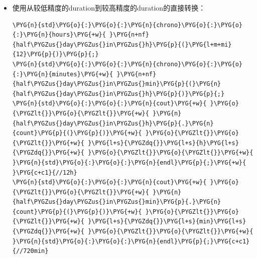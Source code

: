\begin{itemize}
\begin{codeblockbg}
\begin{Verbatim}[commandchars=\\\{\},breaklines=true,breakanywhere=true,fontsize=\codefont,xleftmargin=17bp]
\PYG{k}{using}\PYG{+w}{ }\PYG{k}{namespace}\PYG{+w}{ }\PYG{n+nn}{std}\PYG{o}{:}\PYG{o}{:}\PYG{n+nn}{chrono\PYGZus{}literals}\PYG{p}{;}
\PYG{k}{auto}\PYG{+w}{ }\PYG{n}{half\PYGZus{}day}\PYG{+w}{         }\PYG{o}{=}\PYG{+w}{ }\PYG{l+m+mi}{12}\PYG{n}{h}\PYG{p}{;}
\PYG{k}{auto}\PYG{+w}{ }\PYG{n}{half\PYGZus{}hour}\PYG{+w}{        }\PYG{o}{=}\PYG{+w}{ }\PYG{l+m+mi}{30}\PYG{n}{min}\PYG{p}{;}
\PYG{k}{auto}\PYG{+w}{ }\PYG{n}{half\PYGZus{}minute}\PYG{+w}{      }\PYG{o}{=}\PYG{+w}{ }\PYG{l+m+mi}{30}\PYG{n}{s}\PYG{p}{;}
\PYG{k}{auto}\PYG{+w}{ }\PYG{n}{half\PYGZus{}second}\PYG{+w}{      }\PYG{o}{=}\PYG{+w}{ }\PYG{l+m+mi}{500}\PYG{n}{ms}\PYG{p}{;}
\PYG{k}{auto}\PYG{+w}{ }\PYG{n}{half\PYGZus{}millisecond}\PYG{+w}{ }\PYG{o}{=}\PYG{+w}{ }\PYG{l+m+mi}{500u}\PYG{n}{s}\PYG{p}{;}
\PYG{k}{auto}\PYG{+w}{ }\PYG{n}{half\PYGZus{}microsecond}\PYG{+w}{ }\PYG{o}{=}\PYG{+w}{ }\PYG{l+m+mi}{500}\PYG{n}{ns}\PYG{p}{;}
\end{Verbatim}
\end{codeblockbg}



\item 使用从较低精度的duration到较高精度的duration的直接转换：



\begin{codeblockbg}
\begin{Verbatim}[commandchars=\\\{\},breaklines=true,breakanywhere=true,fontsize=\codefont,xleftmargin=17bp]
\PYG{n}{std}\PYG{o}{:}\PYG{o}{:}\PYG{n}{chrono}\PYG{o}{:}\PYG{o}{:}\PYG{n}{hours}\PYG{+w}{ }\PYG{n+nf}{half\PYGZus{}day\PYGZus{}in\PYGZus{}h}\PYG{p}{(}\PYG{l+m+mi}{12}\PYG{p}{)}\PYG{p}{;}
\PYG{n}{std}\PYG{o}{:}\PYG{o}{:}\PYG{n}{chrono}\PYG{o}{:}\PYG{o}{:}\PYG{n}{minutes}\PYG{+w}{ }\PYG{n+nf}{half\PYGZus{}day\PYGZus{}in\PYGZus{}min}\PYG{p}{(}\PYG{n}{half\PYGZus{}day\PYGZus{}in\PYGZus{}h}\PYG{p}{)}\PYG{p}{;}
\PYG{n}{std}\PYG{o}{:}\PYG{o}{:}\PYG{n}{cout}\PYG{+w}{ }\PYG{o}{\PYGZlt{}}\PYG{o}{\PYGZlt{}}\PYG{+w}{ }\PYG{n}{half\PYGZus{}day\PYGZus{}in\PYGZus{}h}\PYG{p}{.}\PYG{n}{count}\PYG{p}{(}\PYG{p}{)}\PYG{+w}{ }\PYG{o}{\PYGZlt{}}\PYG{o}{\PYGZlt{}}\PYG{+w}{ }\PYG{l+s}{\PYGZdq{}}\PYG{l+s}{h}\PYG{l+s}{\PYGZdq{}}\PYG{+w}{ }\PYG{o}{\PYGZlt{}}\PYG{o}{\PYGZlt{}}\PYG{+w}{ }\PYG{n}{std}\PYG{o}{:}\PYG{o}{:}\PYG{n}{endl}\PYG{p}{;}\PYG{+w}{    }\PYG{c+c1}{//12h}
\PYG{n}{std}\PYG{o}{:}\PYG{o}{:}\PYG{n}{cout}\PYG{+w}{ }\PYG{o}{\PYGZlt{}}\PYG{o}{\PYGZlt{}}\PYG{+w}{ }\PYG{n}{half\PYGZus{}day\PYGZus{}in\PYGZus{}min}\PYG{p}{.}\PYG{n}{count}\PYG{p}{(}\PYG{p}{)}\PYG{+w}{ }\PYG{o}{\PYGZlt{}}\PYG{o}{\PYGZlt{}}\PYG{+w}{ }\PYG{l+s}{\PYGZdq{}}\PYG{l+s}{min}\PYG{l+s}{\PYGZdq{}}\PYG{+w}{ }\PYG{o}{\PYGZlt{}}\PYG{o}{\PYGZlt{}}\PYG{+w}{ }\PYG{n}{std}\PYG{o}{:}\PYG{o}{:}\PYG{n}{endl}\PYG{p}{;}\PYG{c+c1}{//720min}
\end{Verbatim}
\end{codeblockbg}



\end{itemize}
